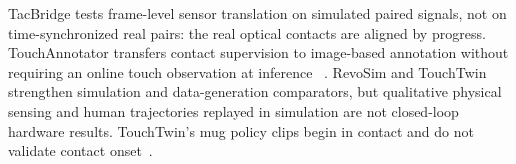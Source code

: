 TacBridge tests frame-level sensor translation on simulated paired signals, not
on time-synchronized real pairs: the real optical contacts are aligned by
progress. TouchAnnotator transfers contact supervision to image-based annotation
without requiring an online touch observation at inference
~\cite{nov18tacbridge,nov18touchannotator}. RevoSim and TouchTwin strengthen
simulation and data-generation comparators, but qualitative physical sensing
and human trajectories replayed in simulation are not closed-loop hardware
results. TouchTwin's mug policy clips begin in contact and do not validate
contact onset~\cite{nov18revosim,nov18touchtwin}.
